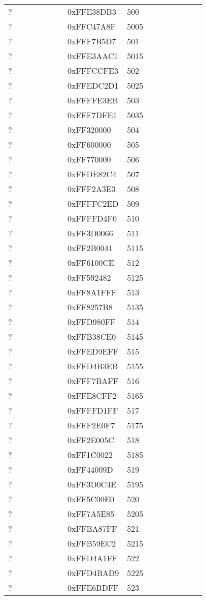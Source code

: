 \begin{longtable}{p{0.3\linewidth} p{0.3\linewidth} p{0.4\linewidth}}
? &  0xFFE38DB3 &  500\\
? &  0xFFC47A8F &  5005\\
? &  0xFFF7B5D7 &  501\\
? &  0xFFE3AAC1 &  5015\\
? &  0xFFFCCFE3 &  502\\
? &  0xFFEDC2D1 &  5025\\
? &  0xFFFFE3EB &  503\\
? &  0xFFF7DFE1 &  5035\\
? &  0xFF320000 &  504\\
? &  0xFF600000 &  505\\
? &  0xFF770000 &  506\\
? &  0xFFDE82C4 &  507\\
? &  0xFFF2A3E3 &  508\\
? &  0xFFFFC2ED &  509\\
? &  0xFFFFD4F0 &  510\\
? &  0xFF3D0066 &  511\\
? &  0xFF2B0041 &  5115\\
? &  0xFF6100CE &  512\\
? &  0xFF592482 &  5125\\
? &  0xFF8A1FFF &  513\\
? &  0xFF8257B8 &  5135\\
? &  0xFFD980FF &  514\\
? &  0xFFB38CE0 &  5145\\
? &  0xFFED9EFF &  515\\
? &  0xFFD4B3EB &  5155\\
? &  0xFFF7BAFF &  516\\
? &  0xFFE8CFF2 &  5165\\
? &  0xFFFFD1FF &  517\\
? &  0xFFF2E0F7 &  5175\\
? &  0xFF2E005C &  518\\
? &  0xFF1C0022 &  5185\\
? &  0xFF44009D &  519\\
? &  0xFF3D0C4E &  5195\\
? &  0xFF5C00E0 &  520\\
? &  0xFF7A5E85 &  5205\\
? &  0xFFBA87FF &  521\\
? &  0xFFB59EC2 &  5215\\
? &  0xFFD4A1FF &  522\\
? &  0xFFD4BAD9 &  5225\\
? &  0xFFE6BDFF &  523\\

\end{longtable}
